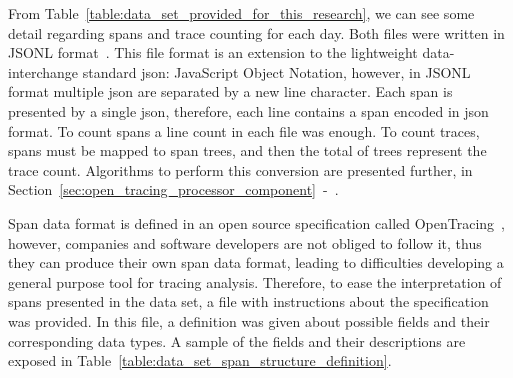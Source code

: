 From Table~\ref{table:data_set_provided_for_this_research}, we can see some detail regarding spans and trace counting for each day. Both files were written in JSONL format~\cite{jsonl}. This file format is an extension to the lightweight data-interchange standard \gls{json}: JavaScript Object Notation, however, in JSONL format multiple \gls{json} are separated by a new line character. Each span is presented by a single \gls{json}, therefore, each line contains a span encoded in \gls{json} format. To count spans a line count in each file was enough. To count traces, spans must be mapped to span trees, and then the total of trees represent the trace count.  Algorithms to perform this conversion are presented further, in Section~\ref{sec:open_tracing_processor_component}~-~.

Span data format is defined in an open source specification called OpenTracing~\cite{open_tracing_specification}, however, companies and software developers are not obliged to follow it, thus they can produce their own span data format, leading to difficulties developing a general purpose tool for tracing analysis. Therefore, to ease the interpretation of spans presented in the data set, a file with instructions about the specification was provided. In this file, a definition was given about possible fields and their corresponding data types. A sample of the fields and their descriptions are exposed in Table~\ref{table:data_set_span_structure_definition}.

